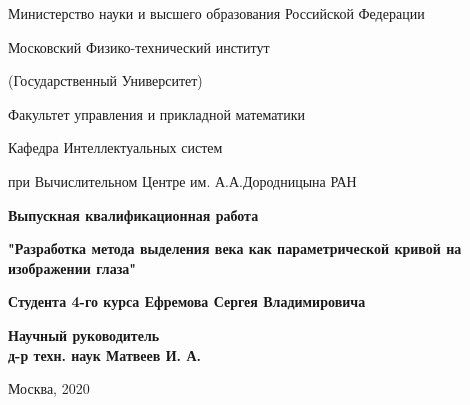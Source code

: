 \documentclass[12pt,a4paper]{article} %
\begin{document}
	
\vskip 3mm

\setcounter{page}{1}
\begin{center}
	\thispagestyle{empty}
	
	{ Министерство науки и высшего образования Российской Федерации\\}

	
	
	{ Московский Физико-технический институт \\}
	
	{ (Государственный Университет) \\}
	
	{ Факультет управления и прикладной математики  \\}
	
	{ Кафедра Интеллектуальных систем\\}
	
	{при Вычислительном Центре им. А.А.Дородницына РАН\\ [4cm]}
	
	{ \bf \Large Выпускная квалификационная работа\\}
	
	{ \bf \Large{"Разработка метода выделения века как параметрической кривой на изображении глаза"\\[1cm]} }
	
	{\bf {Студента 4-го курса Ефремова Сергея Владимировича}\\[3cm]}
	
\end{center}

\begin{flushright}
	\bf{Научный руководитель}\\
	\bf{д-р техн. наук Матвеев И. А.}\\[4cm]
\end{flushright}


\begin{center}
	Москва, 2020
\end{center}

\newpage
\begin{abstract}

Рассматривается задача выделения века как параметрической кривой на изображении глаза. Исследованы предложенные ранее схемы решения этой проблемы, на основе изученных материалов разработан подход по его выделению как параболы с помощью поиска максимума на множестве проекций. Предложен, реализован и протестирован алгоритм, основанный на параболическом преобразовании и преобразовании Радона.	

\end{abstract}
\end{document}
